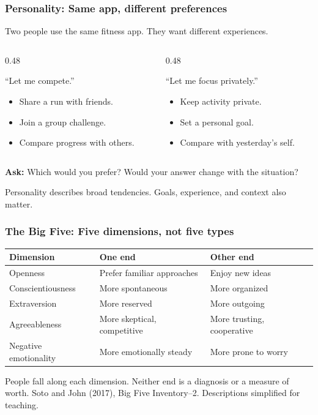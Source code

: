 \documentclass{beamer}
\begin{document}
\begin{frame}
\frametitle{Personality: Same app, different preferences}
\small
Two people use the same fitness app. They want different experiences.
\medskip
\begin{columns}[t]
\begin{column}{0.48\textwidth}
\begin{block}{``Let me compete.''}
\begin{itemize}
\item Share a run with friends.
\item Join a group challenge.
\item Compare progress with others.
\end{itemize}
\end{block}
\end{column}
\begin{column}{0.48\textwidth}
\begin{block}{``Let me focus privately.''}
\begin{itemize}
\item Keep activity private.
\item Set a personal goal.
\item Compare with yesterday's self.
\end{itemize}
\end{block}
\end{column}
\end{columns}
\medskip
\textbf{Ask:} Which would you prefer? Would your answer change with the situation?
\medskip

Personality describes broad tendencies. Goals, experience, and context also matter.
\end{frame}

\begin{frame}
\frametitle{The Big Five: Five dimensions, not five types}
\small
\renewcommand{\arraystretch}{1.3}
\begin{tabular}{@{}p{2.5cm}p{3.4cm}p{3.4cm}@{}}
\toprule
\textbf{Dimension} & \textbf{One end} & \textbf{Other end}\\
\midrule
Openness & Prefer familiar approaches & Enjoy new ideas\\
Conscientiousness & More spontaneous & More organized\\
Extraversion & More reserved & More outgoing\\
Agreeableness & More skeptical, competitive & More trusting, cooperative\\
Negative emotionality & More emotionally steady & More prone to worry\\
\bottomrule
\end{tabular}
\medskip

People fall along each dimension. Neither end is a diagnosis or a measure of worth.
\vfill
{\tiny Soto and John (2017), Big Five Inventory--2. Descriptions simplified for teaching.}
\end{frame}
\end{document}
